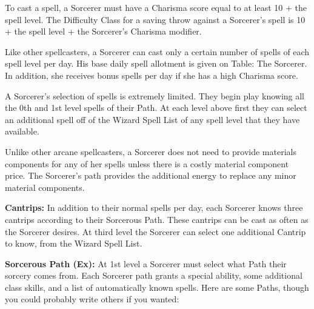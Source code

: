 To cast a spell, a Sorcerer must have a Charisma score equal to at least 10 + the spell level. The Difficulty Class for a saving throw against a Sorcerer's spell is 10 + the spell level + the Sorcerer's Charisma modifier.

Like other spellcasters, a Sorcerer can cast only a certain number of spells of each spell level per day. His base daily spell allotment is given on Table: The Sorcerer. In addition, she receives bonus spells per day if she has a high Charisma score.

A Sorcerer's selection of spells is extremely limited. They begin play knowing all the 0th and 1st level spells of their Path. At each level above first they can select an additional spell off of the Wizard Spell List of any spell level that they have available.

Unlike other arcane spellcasters, a Sorcerer does not need to provide materials components for any of her spells unless there is a costly material component price. The Sorcerer's path provides the additional energy to replace any minor material components.

\textbf{Cantrips:} In addition to their normal spells per day, each Sorcerer knows three cantrips according to their Sorcerous Path. These cantrips can be cast as often as the Sorcerer desires. At third level the Sorcerer can select one additional Cantrip to know, from the Wizard Spell List. 

\textbf{Sorcerous Path (Ex):} At 1st level a Sorcerer must select what Path their sorcery comes from. Each Sorcerer path grants a special ability, some additional class skills, and a list of automatically known spells. Here are some Paths, though you could probably write others if you wanted:

